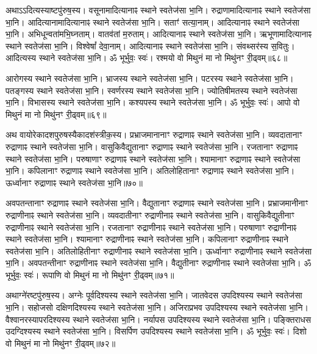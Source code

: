 अथाऽऽदित्यस्याष्टपु॑रुष॒स्य। 
वसूनामादित्यानाꣴ स्थाने स्वतेज॑सा भा॒नि। 
रुद्राणामादित्यानाꣴ स्थाने स्वतेज॑सा भा॒नि। 
आदित्यानामादि\-त्यानाꣴ स्थाने स्वतेज॑सा भा॒नि। 
सताꣳ॑ सत्या॒नाम्। आदित्यानाꣴ स्थाने स्वतेज॑सा भा॒नि। 
अभिधून्वता॑\-मभि॒घ्नताम्। वातव॑तां म॒रुताम्। 
आदित्यानाꣴ स्थाने स्वतेज॑सा भा॒नि। 
ऋभूणामादित्यानाꣴ स्थाने स्वतेज॑सा भा॒नि। 
विश्वेषां᳚ देवा॒नाम्। आदित्यानाꣴ स्थाने स्वतेज॑सा भा॒नि। 
संवथ्सर॑स्य स॒वितुः। आदित्यस्य स्थाने स्वतेज॑सा भा॒नि। 
ॐ भूर्भुवः॒ स्वः॑। रश्मयो वो मिथुनं मा नो मिथु॑नꣳ री॒ढ्वम्॥६८॥\anuvakamend


आरोगस्य स्थाने स्वतेज॑सा भा॒नि। भ्राजस्य स्थाने स्वतेज॑सा भा॒नि। 
पटरस्य स्थाने स्वतेज॑सा भा॒नि। पतङ्गस्य स्थाने स्वतेज॑सा भा॒नि। 
स्वर्णरस्य स्थाने स्वतेज॑सा भा॒नि। ज्योतिषीमतस्य स्थाने स्वतेज॑सा भा॒नि। 
विभासस्य स्थाने स्वतेज॑सा भा॒नि। कश्यपस्य स्थाने स्वतेज॑सा भा॒नि। 
ॐ भूर्भुवः॒ स्वः॑। आपो वो मिथुनं मा नो मिथु॑नꣳ री॒ढ्वम्॥६९॥\anuvakamend


अथ वायोरेकादशपुरुषस्यैकादश॑स्त्रीक॒स्य। 
प्रभ्राजमानानाꣳ रुद्राणाꣴ स्थाने स्वतेज॑सा भा॒नि। 
व्यवदातानाꣳ रुद्राणाꣴ स्थाने स्वतेज॑सा भा॒नि। 
वासुकिवैद्युतानाꣳ रुद्राणाꣴ स्थाने स्वतेज॑सा भा॒नि। 
रजतानाꣳ रुद्राणाꣴ स्थाने स्वतेज॑सा भा॒नि। 
परुषाणाꣳ रुद्राणाꣴ स्थाने स्वतेज॑सा भा॒नि। 
श्यामानाꣳ रुद्राणाꣴ स्थाने स्वतेज॑सा भा॒नि। 
कपिलानाꣳ रुद्राणाꣴ स्थाने स्वतेज॑सा भा॒नि। 
अतिलोहितानाꣳ रुद्राणाꣴ स्थाने स्वतेज॑सा भा॒नि। 
ऊर्ध्वानाꣳ रुद्राणाꣴ स्थाने स्वतेज॑सा भा॒नि॥७०॥


अवपतन्तानाꣳ रुद्राणाꣴ स्थाने स्वतेज॑सा भा॒नि। 
वैद्युतानाꣳ रुद्राणाꣴ स्थाने स्वतेज॑सा भा॒नि। 
प्रभ्राजमानीनाꣳ रुद्राणीनाꣴ स्थाने स्वतेज॑सा भा॒नि। 
व्यवदातीनाꣳ रुद्राणीनाꣴ स्थाने स्वतेज॑सा भा॒नि। 
वासुकिवैद्युतीनाꣳ रुद्राणीनाꣴ स्थाने स्वतेज॑सा भा॒नि। 
रजतानाꣳ रुद्राणीनाꣴ स्थाने स्वतेज॑सा भा॒नि। 
परुषाणाꣳ रुद्राणीनाꣴ स्थाने स्वतेज॑सा भा॒नि। 
श्यामानाꣳ रुद्राणीनाꣴ स्थाने स्वतेज॑सा भा॒नि। 
कपिलानाꣳ रुद्राणीनाꣴ स्थाने स्वतेज॑सा भा॒नि। 
अतिलोहितीनाꣳ रुद्राणीनाꣴ स्थाने स्वतेज॑सा भा॒नि। 
ऊर्ध्वानाꣳ रुद्राणीनाꣴ स्थाने स्वतेज॑सा भा॒नि। 
अवपतन्तीनाꣳ रुद्राणीनाꣴ स्थाने स्वतेज॑सा भा॒नि। 
वैद्युतीनाꣳ रुद्राणीनाꣴ स्थाने स्वतेज॑सा भा॒नि। 
ॐ भूर्भुवः॒ स्वः॑। रूपाणि वो मिथुनं मा नो मिथु॑नꣳ री॒ढ्वम्॥७१॥\anuvakamend


अथाग्ने॑रष्टपु॑रुष॒स्य। 
अग्नेः पूर्वदिश्यस्य स्थाने स्वतेज॑सा भा॒नि। 
जातवेदस उपदिश्यस्य स्थाने स्वतेज॑सा भा॒नि। 
सहोजसो दक्षिणदिश्यस्य स्थाने स्वतेज॑सा भा॒नि। 
अजिराप्रभव उपदिश्यस्य स्थाने स्वतेज॑सा भा॒नि। 
वैश्वानरस्यापरदिश्यस्य स्थाने स्वतेज॑सा भा॒नि। 
नर्यापस उपदिश्यस्य स्थाने स्वतेज॑सा भा॒नि। 
पङ्क्तिराधस उदग्दिश्यस्य स्थाने स्वतेज॑सा भा॒नि। 
विसर्पिण उपदिश्यस्य स्थाने स्वतेज॑सा भा॒नि। 
ॐ भूर्भुवः॒ स्वः॑। दिशो वो मिथुनं मा नो मिथु॑नꣳ री॒ढ्वम्॥७२॥\anuvakamend


